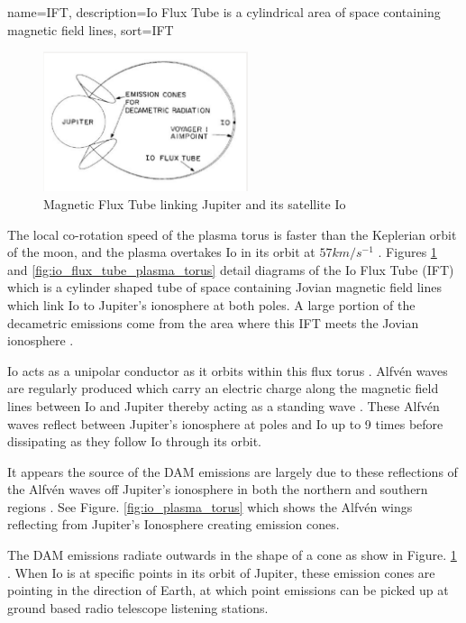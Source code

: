 \documentclass[runningheads,a4paper]{llncs}
\begin{document}
%
{
  name={IFT},
  description={Io Flux Tube is a cylindrical area of space containing magnetic field lines},
  sort=IFT
}
%

%
\begin{figure}[here]
\centering
\includegraphics[width=6cm]{images/03}
\caption{Magnetic Flux Tube linking Jupiter and its satellite Io \citep{belcher87}}
\label{fig:io_flux_tube}
\end{figure}
%

The local co-rotation speed of the plasma torus is faster than the Keplerian orbit of the moon, and the plasma overtakes Io in its orbit at \begin{math} 57 km/s^{-1} \end{math} \citep{belcher87}. Figures \ref{fig:io_flux_tube} and \ref{fig:io_flux_tube_plasma_torus} detail diagrams of the Io Flux Tube (\gls{IFT}) which is a cylinder shaped tube of space containing Jovian magnetic field lines \citep{belcher87} which link Io to Jupiter's ionosphere at both poles. A large portion of the decametric emissions come from the area where this \gls{IFT} meets the Jovian ionosphere \citep{belcher87}. 

Io acts as a unipolar conductor as it orbits within this flux torus \citep{bose08}. Alfv\'en waves are regularly produced which carry an electric charge along the magnetic field lines between Io and Jupiter \citep{bose08} thereby acting as a standing wave \citep{bose08}. These Alfv\'en waves reflect between Jupiter's ionosphere at poles and Io up to 9 times \citep{bose08} before dissipating as they follow Io through its orbit. 

It appears the source of the \gls{DAM} emissions are largely due to these reflections of the Alfv\'en waves off Jupiter's ionosphere in both the northern and southern regions \citep{bose08}. See Figure. \ref{fig:io_plasma_torus} which shows the Alfv\'en wings reflecting from Jupiter's Ionosphere creating emission cones.

The \gls{DAM} emissions radiate outwards in the shape of a cone as show in Figure. \ref{fig:io_flux_tube} \citep{belcher87}. When Io is at specific points in its orbit of Jupiter, these emission cones are pointing in the direction of Earth, at which point emissions can be picked up at ground based radio telescope listening stations.
\end{document}
